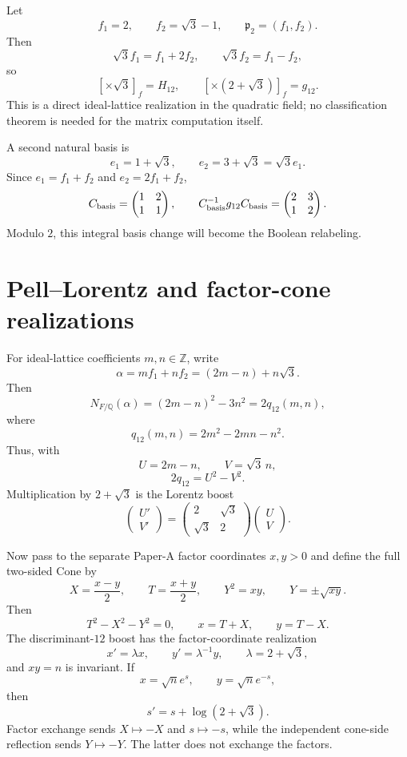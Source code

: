 \documentclass[11pt]{article}
\theoremstyle{remark}
\newcommand{\Q}{\mathbb Q}
\newcommand{\Z}{\mathbb Z}
\begin{document}
Let
\[
f_1=2,
\qquad f_2=\sqrt3-1,
\qquad \mathfrak p_2=(f_1,f_2).
\]
Then
\[
\sqrt3 f_1=f_1+2f_2,
\qquad
\sqrt3 f_2=f_1-f_2,
\]
so
\[
[\times\sqrt3]_f=H_{12},
\qquad
[\times(2+\sqrt3)]_f=g_{12}.
\]
This is a direct ideal-lattice realization in the quadratic field; no
classification theorem is needed for the matrix computation itself.

A second natural basis is
\[
e_1=1+\sqrt3,
\qquad e_2=3+\sqrt3=\sqrt3 e_1.
\]
Since $e_1=f_1+f_2$ and $e_2=2f_1+f_2$,
\[
C_{\rm basis}=\begin{pmatrix}1&2\\1&1\end{pmatrix},
\qquad
C_{\rm basis}^{-1}g_{12}C_{\rm basis}
=\begin{pmatrix}2&3\\1&2\end{pmatrix}.
\]
Modulo $2$, this integral basis change will become the Boolean relabeling.

\section{Pell--Lorentz and factor-cone realizations}

For ideal-lattice coefficients $m,n\in\Z$, write
\[
\alpha=mf_1+nf_2=(2m-n)+n\sqrt3.
\]
Then
\[
N_{F/\Q}(\alpha)
=(2m-n)^2-3n^2
=2q_{12}(m,n),
\]
where
\[
q_{12}(m,n)=2m^2-2mn-n^2.
\]
Thus, with
\[
U=2m-n,
\qquad V=\sqrt3\,n,
\]
\[
2q_{12}=U^2-V^2.
\]
Multiplication by $2+\sqrt3$ is the Lorentz boost
\[
\begin{pmatrix}U'\\V'\end{pmatrix}
=
\begin{pmatrix}2&\sqrt3\\\sqrt3&2\end{pmatrix}
\begin{pmatrix}U\\V\end{pmatrix}.
\]

Now pass to the separate Paper-A factor coordinates $x,y>0$ and define the
full two-sided Cone by
\[
X=\frac{x-y}{2},
\qquad T=\frac{x+y}{2},
\qquad Y^2=xy,
\qquad Y=\pm\sqrt{xy}.
\]
Then
\[
T^2-X^2-Y^2=0,
\qquad x=T+X,
\qquad y=T-X.
\]
The discriminant-$12$ boost has the factor-coordinate realization
\[
\boxed{x'=\lambda x,\qquad y'=\lambda^{-1}y,}
\qquad \lambda=2+\sqrt3,
\]
and $xy=n$ is invariant.  If
\[
x=\sqrt n e^s,
\qquad y=\sqrt n e^{-s},
\]
then
\[
\boxed{s'=s+\log(2+\sqrt3).}
\]
Factor exchange sends $X\mapsto-X$ and $s\mapsto-s$, while the independent
cone-side reflection sends $Y\mapsto-Y$.  The latter does not exchange the
factors.
\end{document}
